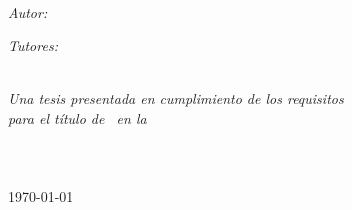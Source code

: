 \documentclass[
11pt, %
english, %
spanish,
singlespacing, %
liststotoc, %
parskip, %
headsepline, %
]{MastersDoctoralThesis} %
\begin{document}

\begin{titlepage}
\begin{center}
\vspace*{3cm}

{\huge \ttitle\par}\vspace{1cm} %
\HRule \\[2cm] %

\begin{minipage}[t]{0.4\textwidth}
\begin{flushleft} \large
\emph{Autor:}\\
\href{}{\authorname} %
\end{flushleft}
\end{minipage}
\begin{minipage}[t]{0.4\textwidth}
\begin{flushright} \large
\emph{Tutores:} \\
\href{}{\supname} %
\end{flushright}
\end{minipage}\\[2cm]

\large \textit{Una tesis presentada en cumplimiento de los requisitos\\ para el título de \degreename \ en la}\\[1cm]

\univname\\ %
\facname\\ %
\deptname \\[2cm]

{\large\today}\\[1cm] %

\vfill

\end{center}
\end{titlepage}


\end{document}
